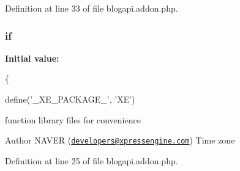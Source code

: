 Definition at line 33 of file blogapi.\-addon.\-php.

\hypertarget{blogapi_8addon_8php_ae00067f6d78515f89a86a2a7f42cdc80}{
\subsubsection[{if}]{\setlength{\rightskip}{0pt plus 5cm}if}}\label{blogapi_8addon_8php_ae00067f6d78515f89a86a2a7f42cdc80}
{\bfseries Initial value\-:}
\begin{DoxyCode}
\{
    
    define(\textcolor{stringliteral}{'\_XE\_PACKAGE\_'}, \textcolor{stringliteral}{'XE'})
\end{DoxyCode}
function library files for convenience

\begin{DoxyAuthor}{Author}
N\-A\-V\-E\-R (\href{mailto:developers@xpressengine.com}{\tt developers@xpressengine.\-com}) Time zone 
\end{DoxyAuthor}


Definition at line 25 of file blogapi.\-addon.\-php.

